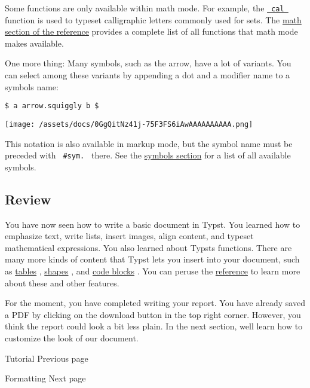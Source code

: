Some functions are only available within math mode. For example, the
\href{/docs/reference/math/variants/\#functions-cal}{\texttt{\ cal\ }}
function is used to typeset calligraphic letters commonly used for sets.
The \href{/docs/reference/math/}{math section of the reference} provides
a complete list of all functions that math mode makes available.

One more thing: Many symbols, such as the arrow, have a lot of variants.
You can select among these variants by appending a dot and a modifier
name to a symbol\textquotesingle s name:

\begin{verbatim}
$ a arrow.squiggly b $
\end{verbatim}

\texttt{[image: /assets/docs/0GgQitNz41j-75F3FS6iAwAAAAAAAAAA.png]}

This notation is also available in markup mode, but the symbol name must
be preceded with \texttt{\ \#sym.\ } there. See the
\href{/docs/reference/symbols/sym/}{symbols section} for a list of all
available symbols.

\subsection{Review}\label{review}

You have now seen how to write a basic document in Typst. You learned
how to emphasize text, write lists, insert images, align content, and
typeset mathematical expressions. You also learned about
Typst\textquotesingle s functions. There are many more kinds of content
that Typst lets you insert into your document, such as
\href{/docs/reference/model/table/}{tables} ,
\href{/docs/reference/visualize/}{shapes} , and
\href{/docs/reference/text/raw/}{code blocks} . You can peruse the
\href{/docs/reference/}{reference} to learn more about these and other
features.

For the moment, you have completed writing your report. You have already
saved a PDF by clicking on the download button in the top right corner.
However, you think the report could look a bit less plain. In the next
section, we\textquotesingle ll learn how to customize the look of our
document.

\href{/docs/tutorial/}{\pandocbounded{}}

{ Tutorial } { Previous page }

\href{/docs/tutorial/formatting/}{\pandocbounded{}}

{ Formatting } { Next page }
